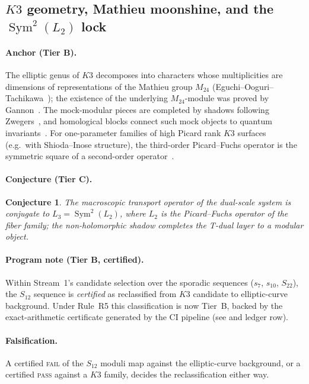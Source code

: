 \documentclass[11pt,a4paper]{article}
\theoremstyle{plain}
\newtheorem{conjecture}{Conjecture}
\theoremstyle{definition}
\theoremstyle{remark}
\newcommand{\tierB}{\textbf{Tier B}}
\newcommand{\tierC}{\textbf{Tier C}}
\begin{document}
\subsection{$K3$ geometry, Mathieu moonshine, and the
$\operatorname{Sym}^{2}(L_{2})$ lock}\label{sec:k3}

\paragraph{Anchor (\tierB{}).} The elliptic genus of $K3$ decomposes into
characters whose multiplicities are dimensions of representations of the
Mathieu group $M_{24}$ (Eguchi--Ooguri--Tachikawa~\cite{EOT2011}); the
existence of the underlying $M_{24}$-module was proved by
Gannon~\cite{Gannon2016}. The mock-modular pieces are completed by shadows
following Zwegers~\cite{Zwegers2002}, and homological blocks connect such
mock objects to quantum invariants~\cite{GPPV2020}. For one-parameter
families of high Picard rank $K3$ surfaces (e.g.\ with Shioda--Inose
structure), the third-order Picard--Fuchs operator is the symmetric square
of a second-order operator~\cite{Doran2000}.

\paragraph{Conjecture (\tierC{}).}
\begin{conjecture}\label{conj:lock}
The macroscopic transport operator of the dual-scale system is conjugate to
$L_{3}=\operatorname{Sym}^{2}(L_{2})$, where $L_{2}$ is the Picard--Fuchs
operator of the fiber family; the non-holomorphic shadow completes the
T-dual layer to a modular object.
\end{conjecture}

\paragraph{Program note (\tierB{}, certified).} Within Stream~1's
candidate selection over the sporadic sequences ($s_{7}$, $s_{10}$,
$S_{22}$), the $S_{12}$ sequence is \emph{certified} as reclassified from
$K3$ candidate to elliptic-curve background. Under Rule~R5 this
classification is now Tier~B, backed by the exact-arithmetic certificate
generated by the CI pipeline (see  and ledger row).

\paragraph{Falsification.} A certified \textsc{fail} of the $S_{12}$ moduli
map against the elliptic-curve background, or a certified \textsc{pass}
against a $K3$ family, decides the reclassification either way.
\end{document}
